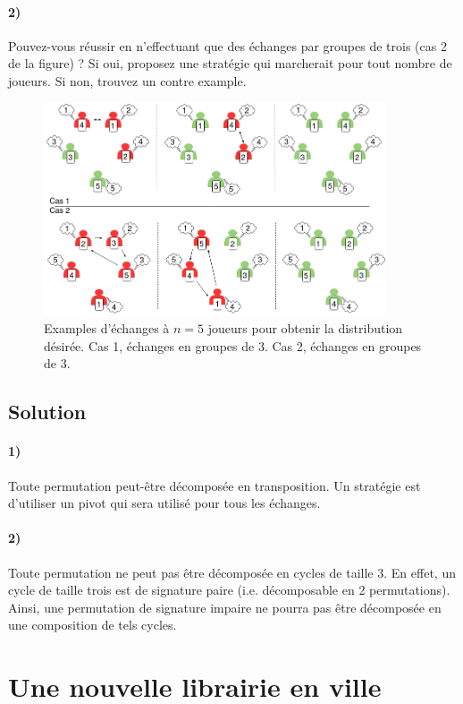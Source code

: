 \documentclass[a4paper,10pt,oneside]{article}
\begin{document}
\paragraph*{2)} 
Pouvez-vous réussir en n'effectuant que des échanges par groupes de trois (cas 2 de la figure) ?
Si oui, proposez une stratégie qui marcherait pour tout nombre de joueurs.
Si non, trouvez un contre example.

\begin{figure}[!h]
  \centering
  \includegraphics[width=0.9\textwidth]{figures/traders.png}
  \caption{Examples d'échanges à $n=5$ joueurs pour obtenir la distribution désirée. Cas 1, échanges en groupes de 3. Cas 2, échanges en groupes de 3.}
\end{figure}

\subsection{Solution}

\paragraph*{1)}
Toute permutation peut-être décomposée en transposition. 
Un stratégie est d'utiliser un pivot qui sera utilisé pour tous les échanges.

\paragraph*{2)} 
Toute permutation ne peut pas être décomposée en cycles de taille 3. 
En effet, un cycle de taille trois est de signature paire (i.e. décomposable en 2 permutations).
Ainsi, une permutation de signature impaire ne pourra pas être décomposée en une composition de tels cycles.


\section{Une nouvelle librairie en ville}
\end{document}
